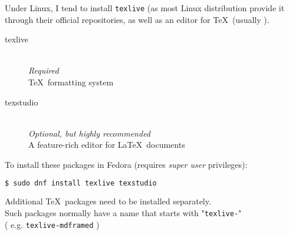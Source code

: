 Under Linux, I tend to install \texttt{texlive}  
(as most Linux distribution provide it through their official repositories, %
 as well as an editor for \TeX\ (usually \TeXstudio).

\begin{description}
	\item[texlive] \mbox{} \\ 
	\emph{Required} \\
	\TeX\ formatting system
	
	\item[texstudio] \mbox{} \\
	\emph{Optional, but highly recommended} \\
	A feature-rich editor for \LaTeX\ documents \\
\end{description}


To install these packages in Fedora (requires \emph{super user} privileges):
\begin{lstlisting}[language=sh]
	$ sudo dnf install texlive texstudio
\end{lstlisting}

\bigskip

Additional \TeX\ packages need to be installed separately. \\

Such packages normally have a name that starts with "\texttt{texlive-}" \\
( e.g. \texttt{texlive-mdframed} )

\bigskip
